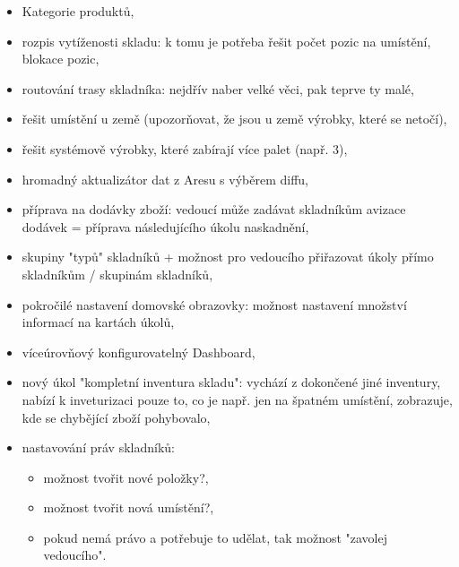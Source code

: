 \begin{itemize}
	\item Kategorie produktů,
	\item rozpis vytíženosti skladu: k tomu je potřeba řešit počet pozic na umístění, blokace pozic,
	\item routování trasy skladníka: nejdřív naber velké věci, pak teprve ty malé,
	\item řešit umístění u země (upozorňovat, že jsou u země výrobky, které se netočí),
	\item řešit systémově výrobky, které zabírají více palet (např. 3),
	\item hromadný aktualizátor dat z Aresu s výběrem diffu,
	\item příprava na dodávky zboží: vedoucí může zadávat skladníkům avizace dodávek = příprava následujícího úkolu naskadnění,
	\item skupiny "typů" skladníků + možnost pro vedoucího přiřazovat úkoly přímo skladníkům / skupinám skladníků,
	\item pokročilé nastavení domovské obrazovky: možnost nastavení množství informací na kartách úkolů,
	\item víceúrovňový konfigurovatelný Dashboard,
	\item nový úkol "kompletní inventura skladu": vychází z dokončené jiné inventury, nabízí k inveturizaci pouze to, co je např. jen na špatném umístění, zobrazuje, kde se chybějící zboží pohybovalo,
	\item nastavování práv skladníků:
	\begin{itemize}
		\item možnost tvořit nové položky?,
		\item možnost tvořit nová umístění?,
		\item pokud nemá právo a potřebuje to udělat, tak možnost "zavolej vedoucího".
	\end{itemize}
\end{itemize}
